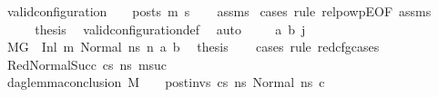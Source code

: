 \begin{isabellebody}
\ {\isachardoublequoteopen}valid{\isacharunderscore}{\kern0pt}configuration\ {\isasymLambda}\ {\isasymGamma}\ {\isasymOmega}\ posts\ m{\isacharprime}{\kern0pt}\ s{\isacharprime}{\kern0pt}{\isachardoublequoteclose}\isanewline
%
\isadelimproof
\ \ %
\endisadelimproof
%
\isatagproof
{}\isamarkupfalse%
\ assms\isanewline
{}\isamarkupfalse%
\ {\isacharparenleft}{\kern0pt}cases\ rule{\isacharcolon}{\kern0pt}\ relpowp{\isacharunderscore}{\kern0pt}E{}{\isacharunderscore}{\kern0pt}{}{\isacharbrackleft}{\kern0pt}OF\ assms{\isacharparenleft}{\kern0pt}{}{\isacharparenright}{\kern0pt}{\isacharbrackright}{\kern0pt}{\isacharparenright}{\kern0pt}\isanewline
\ \ \isamarkupfalse%
\ {}\isanewline
\ \ \isamarkupfalse%
\ \isamarkupfalse%
\ {\isacharquery}{\kern0pt}thesis\ \isamarkupfalse%
\ valid{\isacharunderscore}{\kern0pt}configuration{\isacharunderscore}{\kern0pt}def\ \isamarkupfalse%
\ auto\isanewline
{}\isamarkupfalse%
\isanewline
\ \ \isamarkupfalse%
\ {\isacharparenleft}{\kern0pt}{}\ a\ b\ j{\isacharprime}{\kern0pt}{\isacharparenright}{\kern0pt}\isanewline
\ \ \isamarkupfalse%
\ {\isacartoucheopen}M{\isacharcomma}{\kern0pt}{\isasymLambda}{\isacharcomma}{\kern0pt}{\isasymGamma}{\isacharcomma}{\kern0pt}{\isasymOmega}{\isacharcomma}{\kern0pt}G{}\ {\isasymturnstile}\ {\isacharparenleft}{\kern0pt}Inl\ m{}{\isacharcomma}{\kern0pt}\ Normal\ ns{}{\isacharparenright}{\kern0pt}\ {\isacharminus}{\kern0pt}n{\isasymrightarrow}\ {\isacharparenleft}{\kern0pt}a{\isacharcomma}{\kern0pt}\ b{\isacharparenright}{\kern0pt}{\isacartoucheclose}\ \isamarkupfalse%
\ {\isacharquery}{\kern0pt}thesis\isanewline
\ \ \isamarkupfalse%
\ {\isacharparenleft}{\kern0pt}cases\ rule{\isacharcolon}{\kern0pt}\ red{\isacharunderscore}{\kern0pt}cfg{\isachardot}{\kern0pt}cases{\isacharparenright}{\kern0pt}\isanewline
\ \ \ \ \isamarkupfalse%
\ {\isacharparenleft}{\kern0pt}RedNormalSucc\ cs\ ns{}{\isacharprime}{\kern0pt}{\isacharprime}{\kern0pt}\ msuc{\isacharparenright}{\kern0pt}\isanewline
\ \ \ \ \isamarkupfalse%
\ {\isachardoublequoteopen}dag{\isacharunderscore}{\kern0pt}lemma{\isacharunderscore}{\kern0pt}conclusion\ M\ {\isasymLambda}\ {\isasymGamma}\ {\isasymOmega}\ post{\isacharunderscore}{\kern0pt}invs\ cs{}\ ns{}\ {\isacharparenleft}{\kern0pt}Normal\ ns{}{\isacharprime}{\kern0pt}{\isacharprime}{\kern0pt}{\isacharparenright}{\kern0pt}\ c{\isachardoublequoteclose}\isanewline

\end{isabellebody}
